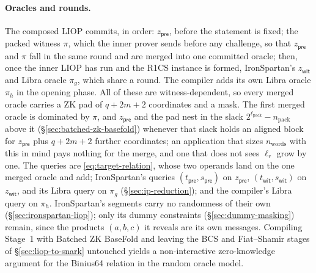 \documentclass{article}
\theoremstyle{definition}
\begin{document}
\paragraph{Oracles and rounds.}
The composed LIOP commits, in order: $z_{\textsf{pre}}$, before the statement is fixed; the packed witness $\pi$, which the inner prover sends before any challenge, so that $z_{\textsf{pre}}$ and $\pi$ fall in the same round and are merged into one committed oracle; then, once the inner LIOP has run and the R1CS instance is formed, IronSpartan's $z_{\textsf{wit}}$ and Libra oracle $\pi_g$, which share a round. The compiler adds its own Libra oracle $\pi_h$ in the opening phase. All of these are witness-dependent, so every merged oracle carries a ZK pad of $q + 2m + 2$ coordinates and a mask. The first merged oracle is dominated by $\pi$, and $z_{\textsf{pre}}$ and the pad nest in the slack $2^{\ell_\text{pack}} - n_\text{pack}$ above it (\S\ref{sec:batched-zk-basefold}) whenever that slack holds an aligned block for $z_{\textsf{pre}}$ plus $q + 2m + 2$ further coordinates; an application that sizes $n_\text{words}$ with this in mind pays nothing for the merge, and one that does not sees $\ell_r$ grow by one. The queries are \eqref{eq:target-relation}, whose two operands land on the one merged oracle and add; IronSpartan's queries $(t_{\textsf{pre}}, s_{\textsf{pre}})$ on $z_{\textsf{pre}}$, $(t_{\textsf{wit}}, s_{\textsf{wit}})$ on $z_{\textsf{wit}}$, and its Libra query on $\pi_g$ (\S\ref{sec:ip-reduction}); and the compiler's Libra query on $\pi_h$. IronSpartan's segments carry no randomness of their own (\S\ref{sec:ironspartan-liop}); only its dummy constraints (\S\ref{sec:dummy-masking}) remain, since the products $(a, b, c)$ it reveals are its own messages. Compiling Stage~1 with Batched ZK BaseFold and leaving the BCS and Fiat--Shamir stages of \S\ref{sec:liop-to-snark} untouched yields a non-interactive zero-knowledge argument for the Binius64 relation in the random oracle model.
\end{document}
